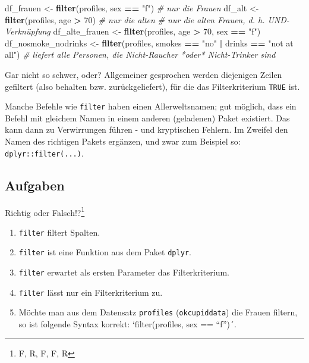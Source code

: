 \documentclass[12pt,ngerman,paper=a4,pagesize,DIV=13]{scrreprt}
\newenvironment{Shaded}{\begin{snugshade}}{\end{snugshade}}
\newcommand{\CommentTok}[1]{\textcolor[rgb]{0.56,0.35,0.01}{\textit{#1}}}
\newcommand{\DecValTok}[1]{\textcolor[rgb]{0.00,0.00,0.81}{#1}}
\newcommand{\KeywordTok}[1]{\textcolor[rgb]{0.13,0.29,0.53}{\textbf{#1}}}
\newcommand{\NormalTok}[1]{#1}
\newcommand{\OperatorTok}[1]{\textcolor[rgb]{0.81,0.36,0.00}{\textbf{#1}}}
\newcommand{\StringTok}[1]{\textcolor[rgb]{0.31,0.60,0.02}{#1}}
\providecommand{\tightlist}{%
  \setlength{\itemsep}{0pt}\setlength{\parskip}{0pt}}
\begin{document}
\begin{Shaded}
\begin{Highlighting}[]
\NormalTok{df_frauen <-}\StringTok{ }\KeywordTok{filter}\NormalTok{(profiles, sex }\OperatorTok{==}\StringTok{ "f"}\NormalTok{)  }\CommentTok{# nur die Frauen}
\NormalTok{df_alt <-}\StringTok{ }\KeywordTok{filter}\NormalTok{(profiles, age }\OperatorTok{>}\StringTok{ }\DecValTok{70}\NormalTok{)  }\CommentTok{# nur die alten}
\CommentTok{# nur die alten Frauen, d. h. UND-Verknüpfung}
\NormalTok{df_alte_frauen <-}\StringTok{ }\KeywordTok{filter}\NormalTok{(profiles, age }\OperatorTok{>}\StringTok{ }\DecValTok{70}\NormalTok{, sex }\OperatorTok{==}\StringTok{ "f"}\NormalTok{)  }
\NormalTok{df_nosmoke_nodrinks <-}\StringTok{ }\KeywordTok{filter}\NormalTok{(profiles, smokes }\OperatorTok{==}\StringTok{ "no"} \OperatorTok{|}\StringTok{ }\NormalTok{drinks }\OperatorTok{==}\StringTok{ "not at all"}\NormalTok{) }
\CommentTok{# liefert alle Personen, die Nicht-Raucher *oder* Nicht-Trinker sind}
\end{Highlighting}
\end{Shaded}

Gar nicht so schwer, oder? Allgemeiner gesprochen werden diejenigen
Zeilen gefiltert (also behalten bzw. zurückgeliefert), für die das
Filterkriterium \texttt{TRUE} ist.

Manche Befehle wie \texttt{filter} haben einen Allerweltsnamen; gut
möglich, dass ein Befehl mit gleichem Namen in einem anderen (geladenen)
Paket existiert. Das kann dann zu Verwirrungen führen - und kryptischen
Fehlern. Im Zweifel den Namen des richtigen Pakets ergänzen, und zwar
zum Beispiel so: \texttt{dplyr::filter(...)}.

\hypertarget{aufgaben}{%
\subsection{Aufgaben}\label{aufgaben}}

Richtig oder Falsch!?\footnote{F, R, F, F, R}

\begin{enumerate}
\def\labelenumi{\arabic{enumi}.}
\tightlist
\item
  \texttt{filter} filtert Spalten.
\item
  \texttt{filter} ist eine Funktion aus dem Paket \texttt{dplyr}.
\item
  \texttt{filter} erwartet als ersten Parameter das Filterkriterium.
\item
  \texttt{filter} lässt nur ein Filterkriterium zu.
\item
  Möchte man aus dem Datensatz \texttt{profiles} (\texttt{okcupiddata})
  die Frauen filtern, so ist folgende Syntax korrekt: `filter(profiles,
  sex == \enquote{f})´.
\end{enumerate}
\end{document}
